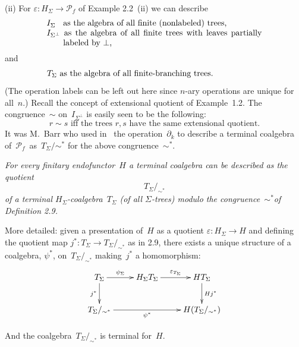 \documentclass{entcs}
\newcommand{\sims}{\ensuremath{\mathrel{\sim^*}}}
\newcommand{\Pf}{\ensuremath{\mathscr{P}_{\!\!f}}}
\newenvironment{pv}[1]{\begin{trivlist}
\item[\hspace{\labelsep}\normalfont\bfseries#1]}%
{\end{trivlist}}
\begin{document}
\begin{pv}{2.10 Examples}
(ii) For $\varepsilon\colon H_\Sigma\to\Pf$ of Example 2.2~(ii)
we can describe
\[\parbox{91mm}{$I_{\Sigma^{\phantom{\perp}}}$
as the algebra of all finite
(nonlabeled) trees,\\
$I_{\Sigma^\perp}$ as the algebra of all finite trees with leaves
partially $\phantom{I_{\Sigma^\perp}}$~labeled by~$\perp$,}\]
and
\[\parbox{91mm}{$T_\Sigma$ as the algebra of all finite-branching
trees.}\]
(The operation labels can be left out here since $n$-ary operations
are unique for all~$n$.) Recall the concept of extensional quotient
of Example~1.2. The congruence~$\sim$ on~$I_{\Sigma^\perp}$ is
easily seen to be the following:
\[\text{$r\sim s$ iff the trees $r,s$ have the same extensional
quotient.}\]
It was M.~Barr who used in~\cite{b} the operation~$\partial_k$ to
describe a terminal coalgebra of~\Pf\ as~$T_\Sigma/{\sims}$ for the
above congruence~\sims.
\end{pv}

\begin{pv}{2.11 Theorem}
\itshape
For every finitary endofunctor~$H$ a terminal coalgebra can be
described as the quotient
\[T_\Sigma/_{\sims}\]
of a terminal $H_\Sigma$-coalgebra~$T_\Sigma$ (of all
$\Sigma$-trees) modulo the congruence~\sims of Definition 2.9.
\end{pv}

\begin{pv}{Remark}
More detailed: given a presentation of~$H$ as a quotient
$\varepsilon\colon H_\Sigma\to H$
and defining the quotient map $j^*\colon
T_\Sigma\to T_\Sigma/_{\sims}$ as in 2.9, there exists a
unique structure of a coalgebra, $\psi^*$, on~$T_\Sigma/_{\sims}$
making~$j^*$ a homomorphism:\vspace{3.5mm}
\[
\xy
\xymatrix{
T_\Sigma
\ar[0,1]^-{\psi_\Sigma}
\ar[1,0]_{j^*}
&
H_\Sigma T_\Sigma
\ar[0,1]^-{\varepsilon_{T_\Sigma}}
&
HT_\Sigma
\ar[1,0]^{Hj^*}
\\
T_\Sigma/_{\sims}
\ar[0,2]_-{\psi^*}
&
&
H(T_\Sigma/_{\sims})
}
\endxy
\]\vspace{1mm}

\noindent
And the coalgebra~$T_\Sigma/_{\sims}$ is terminal for~$H$.
\end{pv}
\end{document}
